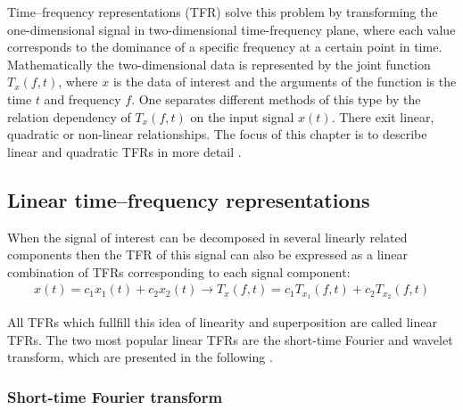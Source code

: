 Time–frequency representations (TFR) solve this problem by transforming the one-dimensional signal in two-dimensional time-frequency plane, where each value corresponds to the dominance of a specific frequency at a certain point in time. Mathematically the two-dimensional data is represented by the joint function $T_{x}(f,t)$, where $x$ is the data of interest and the arguments of the function is the time  $t$ and frequency  $f$. One separates different methods of this type by the relation dependency of $T_{x}(f,t)$ on the input signal $x(t)$. There exit linear, quadratic or non-linear relationships.
The focus of this chapter is to describe linear and quadratic TFRs in more detail \cite{Hlawatsch1992}. 

\subsection{Linear time–frequency representations}
When the signal of interest can be decomposed in several linearly related components then the TFR of this signal can also be expressed as a linear combination of TFRs corresponding to each signal component:
\begin{equation}
    \begin{aligned}
        x(t) = c_{1} x_{1}(t) + c_{2} x_{2}(t) \rightarrow T_{x}(f,t) = c_{1} T_{x_{1}}(f,t) + c_{2} T_{x_{2}}(f,t)
    \end{aligned}
\end{equation}


All TFRs which fullfill this idea of linearity and superposition are called linear TFRs. The two most popular linear TFRs are the short-time Fourier and wavelet transform, which are presented in the following \cite{Hlawatsch1992}. 
\subsubsection{Short-time Fourier transform}

